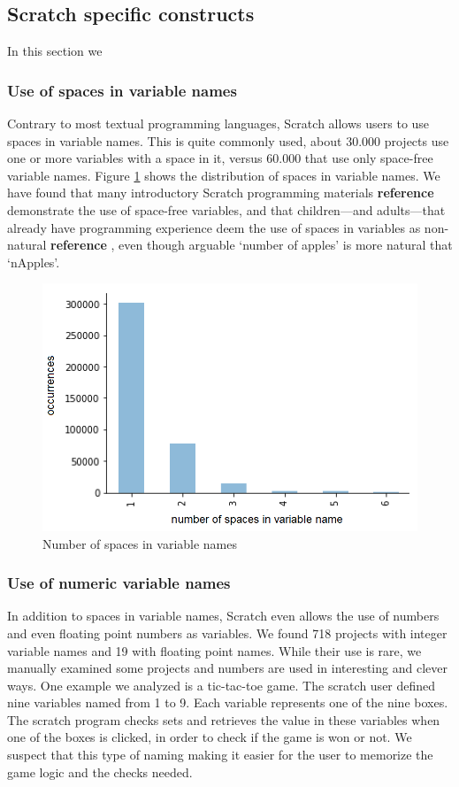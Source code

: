 \documentclass[conference]{IEEEtran}
\newcommand{\todo}[1]{ \textbf{#1} }
\begin{document}
\subsection{Scratch specific constructs}
In this section we 
\subsubsection{Use of spaces in variable names}
Contrary to most textual programming languages, Scratch allows users to use spaces in variable names. This is quite commonly used, about 30.000 projects use one or more variables with a space in it, versus 60.000 that use only space-free variable names. Figure \ref{fig:number_of_spaces} shows the distribution of spaces in variable names. We have found that many introductory Scratch programming materials \todo{reference} demonstrate the use of space-free variables, and that children---and adults---that already have programming experience deem the use of spaces in variables as non-natural\todo{reference}, even though arguable `number of apples' is more natural that `nApples'.

\begin{figure}
	\begin{center}
		\includegraphics[width=\columnwidth]{fig/spaces_varname_occurrences}
		\caption{Number of spaces in variable names}
		\label{fig:number_of_spaces}
	\end{center}
\end{figure} 

\subsubsection{Use of numeric variable names}
In addition to spaces in variable names, Scratch even allows the use of numbers and even floating point numbers as variables. We found 718 projects with integer variable names and 19 with floating point names. While their use is rare, we manually examined some projects and numbers are used in interesting and clever ways. One example we analyzed is a tic-tac-toe game. The scratch user defined nine variables named from 1 to 9. Each variable represents one of the nine boxes. The scratch program checks sets and retrieves the value in these variables when one of the boxes is clicked, in order to check if the game is won or not. We suspect that this type of naming making it easier for the user to memorize the game logic and the checks needed.  
\end{document}
